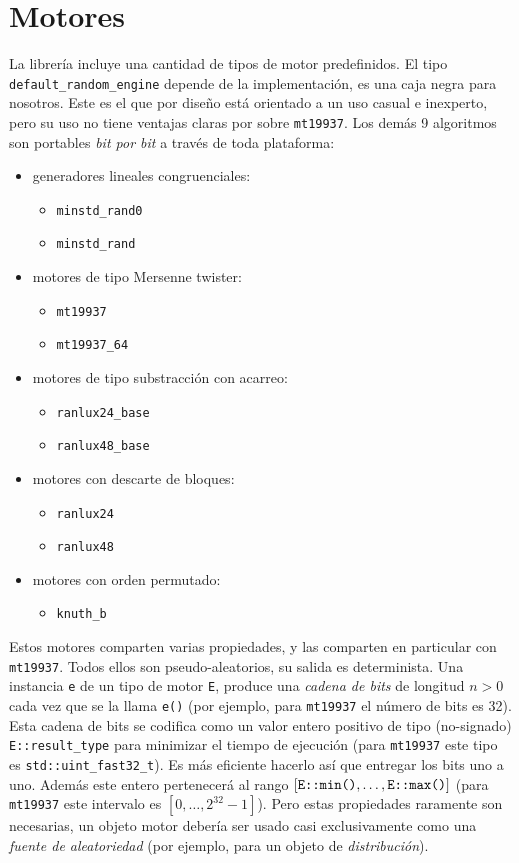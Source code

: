 \documentclass{article}
\begin{document}
\section{Motores}
La librería incluye una cantidad de tipos de motor predefinidos.
El tipo \verb#default_random_engine# depende de la implementación, es una caja negra para nosotros.
Este es el que por diseño está orientado a un uso casual e inexperto, pero su uso no tiene ventajas claras por sobre \verb#mt19937#.
Los demás 9 algoritmos son portables \emph{bit por bit} a través de toda plataforma:
\begin{itemize}
    \item generadores lineales congruenciales:
    \begin{itemize}
        \item \verb#minstd_rand0#
        \item \verb#minstd_rand#
    \end{itemize}
    \item motores de tipo Mersenne twister:
    \begin{itemize}
        \item \verb#mt19937#
        \item \verb#mt19937_64#
    \end{itemize}
    \item motores de tipo substracción con acarreo: 
    \begin{itemize}
        \item \verb#ranlux24_base#
        \item \verb#ranlux48_base#
    \end{itemize}
    \item motores con descarte de bloques:
    \begin{itemize}
        \item \verb#ranlux24#
        \item \verb#ranlux48#
    \end{itemize}
    \item motores con orden permutado:
    \begin{itemize}
        \item \verb#knuth_b#
    \end{itemize}
\end{itemize}

Estos motores comparten varias propiedades, y las comparten en particular con \verb#mt19937#.
Todos ellos son pseudo-aleatorios, su salida es determinista.
Una instancia \verb#e# de un tipo de motor \verb#E#, produce una \emph{cadena de bits} de longitud $n > 0$ cada vez que se la llama \verb#e()# (por ejemplo, para \verb#mt19937# el número de bits es 32).
Esta cadena de bits se codifica como un valor entero positivo de tipo (no-signado) \verb#E::result_type# para minimizar el tiempo de ejecución (para \verb#mt19937# este tipo es \verb#std::uint_fast32_t#).
Es más eficiente hacerlo así que entregar los bits uno a uno.
Además este entero pertenecerá al rango $[\verb#E::min()#, \dots, \verb#E::max()#]$ (para \verb#mt19937# este intervalo es $[0, \dots, 2^{32} - 1]$).
Pero estas propiedades raramente son necesarias, un objeto motor debería ser usado casi exclusivamente como una \emph{fuente de aleatoriedad} (por ejemplo, para un objeto de \emph{distribución}).
\end{document}
